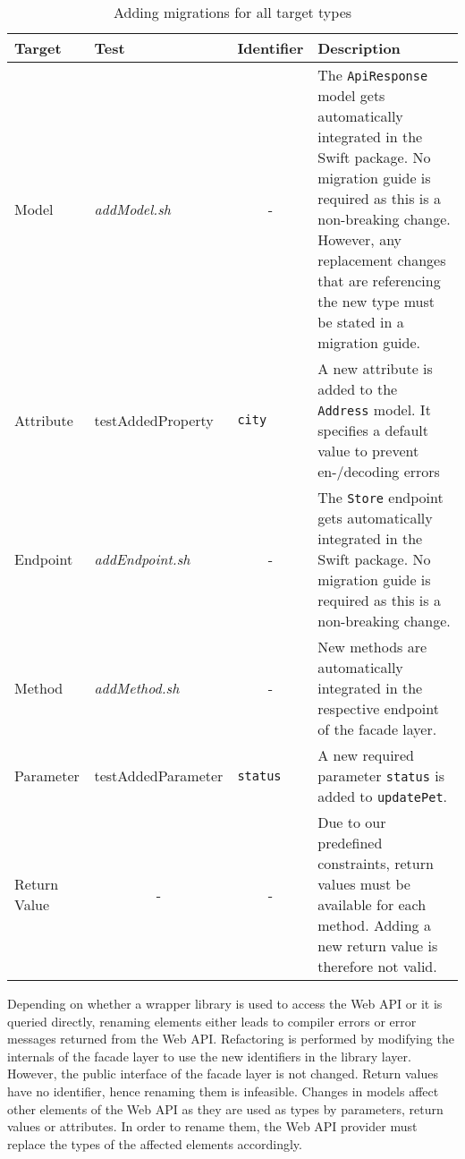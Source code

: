 \begin{table}[!ht]
	\begin{center}
	\begin{tabular}{@{}lp{}p{}p{}@{}}
		\toprule
		\textbf{Target} & \textbf{Test} & \textbf{Identifier} & \textbf{Description} \\ \midrule
		Model           &   \textit{addModel.sh} &    \multicolumn{1}{c}{-}      &   The \texttt{ApiResponse} model gets automatically integrated in the Swift package. No migration guide is required as this is a non-breaking change. However, any replacement changes that are referencing the new type must be stated in a migration guide.  \\
		Attribute       &   test\-Added\-Property   &    \texttt{city}      &      A new attribute is added to the \texttt{Address} model. It specifies a default value to prevent en-/decoding errors       \\
		Endpoint        &          \textit{addEndpoint.sh} &    \multicolumn{1}{c}{-}      &            The \texttt{Store} endpoint gets automatically integrated in the Swift package. No migration guide is required as this is a non-breaking change.                               \\
		Method        &         \textit{addMethod.sh}  &    \multicolumn{1}{c}{-}      &            New methods are automatically integrated in the respective endpoint of the facade layer.                      \\
		Parameter       &               test\-Added\-Parameter                    &    \texttt{status}                        &       A new required parameter \texttt{status} is added to \texttt{updatePet}.             \\
		Return Value    &            \multicolumn{1}{c}{-}  &    \multicolumn{1}{c}{-}                   &      Due to our predefined constraints, return values must be available for each method. Adding a new return value is therefore not valid.         \\ \bottomrule
	\end{tabular}
	\caption{Adding migrations for all target types}
	\label{tab:AddMigrationTests}
		\end{center}
\end{table}

Depending on whether a wrapper library is used to access the Web API or it is queried directly, renaming elements either leads to compiler errors or error messages returned from the Web API. Refactoring is performed by modifying the internals of the facade layer to use the new identifiers in the library layer. However, the public interface of the facade layer is not changed. Return values have no identifier, hence renaming them is infeasible. Changes in models affect other elements of the Web API as they are used as types by parameters, return values or attributes. In order to rename them, the Web API provider must replace the types of the affected elements accordingly.

